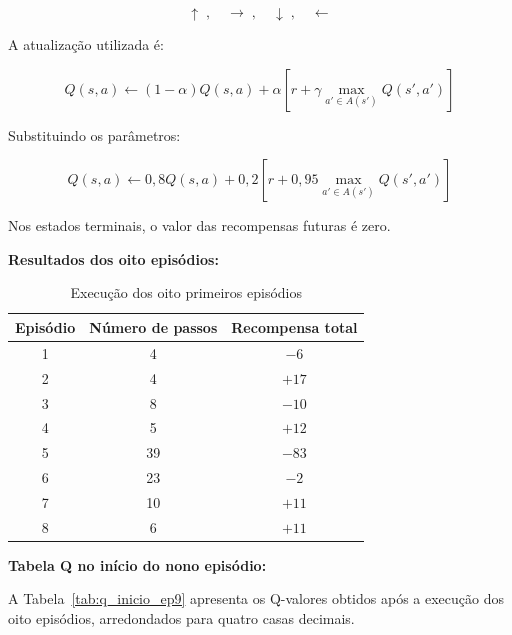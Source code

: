 \[
\uparrow\;,\quad
\rightarrow\;,\quad
\downarrow\;,\quad
\leftarrow
\]

A atualização utilizada é:

\[
Q(s,a)\leftarrow
(1-\alpha)Q(s,a)+
\alpha\left[
r+\gamma\max_{a'\in A(s')}Q(s',a')
\right]
\]

Substituindo os parâmetros:

\[
Q(s,a)\leftarrow
0{,}8Q(s,a)+
0{,}2\left[
r+0{,}95\max_{a'\in A(s')}Q(s',a')
\right]
\]

Nos estados terminais, o valor
das recompensas futuras é zero.

\textbf{Resultados dos oito episódios:}

\begin{table}[H]
\centering
\caption{Execução dos oito primeiros episódios}
\label{tab:episodios_qlearning}
\begin{tabular}{ccc}
\toprule
Episódio & Número de passos & Recompensa total\\
\midrule
1 & 4  & $-6$\\
2 & 4  & $+17$\\
3 & 8  & $-10$\\
4 & 5  & $+12$\\
5 & 39 & $-83$\\
6 & 23 & $-2$\\
7 & 10 & $+11$\\
8 & 6  & $+11$\\
\bottomrule
\end{tabular}
\end{table}

\textbf{Tabela Q no início do nono episódio:}

A Tabela~\ref{tab:q_inicio_ep9} apresenta
os Q-valores obtidos após a execução
dos oito episódios, arredondados
para quatro casas decimais.

